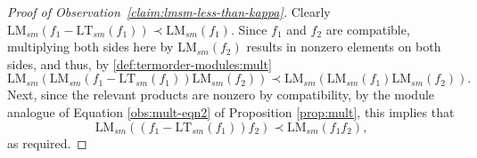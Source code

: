 \documentclass[11pt,reqno]{amsart}
\newcommand{\lmsm}{\text{LM}_{sm}}
\newcommand{\ltsm}{\text{LT}_{sm}}
\theoremstyle{definition}
\numberwithin{equation}{section}
\begin{document}

\begin{proof}[Proof of Observation~\ref{claim:lmsm-less-than-kappa}]
Clearly $\lmsm(f_1 - \ltsm(f_1)) \prec \lmsm(f_1)$. Since $f_1$ and $f_2$ are compatible, multiplying both sides here by $\lmsm(f_2)$ results in nonzero elements on both sides, and thus, by \ref{def:termorder-modules:mult}
\[
\lmsm(\lmsm(f_1 - \ltsm(f_1))\lmsm(f_2)) \prec \lmsm(\lmsm(f_1)\lmsm(f_2)).
\]
Next, since the relevant products are nonzero by compatibility, by the module analogue of Equation \eqref{obs:mult-eqn2} of Proposition \ref{prop:mult}, this implies that 
\[
\lmsm((f_1 - \ltsm(f_1))f_2) \prec \lmsm(f_1f_2),
\]
as required.
\end{proof}

\end{document}
